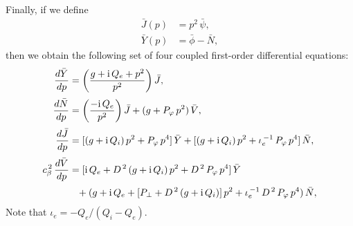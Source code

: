\documentclass[12pt,prb,aps]{revtex4-1}
\begin{document}
Finally, if we define 
\begin{align}
\bar{J}(p)&= p^2\,\bar{\psi},\\[0.5ex]
\bar{Y} (p)&= \bar{\phi}-\bar{N},\label{e43}
\end{align}
then we obtain the following set of four coupled first-order differential equations:
\begin{align}\label{e1}
\frac{d\bar{Y}}{dp} &= \left(\frac{g+{\rm i}\,Q_e+p^2}{p^2}\right)\bar{J},\\[0.5ex]
\frac{d\bar{N}}{dp} &= \left(\frac{-{\rm i}\,Q_e}{p^2}\right)\bar{J} + (g + P_\varphi\,p^2)\,\bar{V},\\[0.5ex]
\frac{d\bar{J}}{dp} &= [(g+{\rm i}\,Q_i)\,p^2 + P_\varphi\,p^4]\,\bar{Y}
+ [(g+{\rm i}\,Q_i)\,p^2 + \iota_e^{\,-1}\,P_\varphi\,p^4]\,\bar{N},\\[0.5ex]
c_\beta^{\,2}\,\frac{d\bar{V}}{dp} &= [{\rm i}\,Q_e+ D^{\,2}\,(g+{\rm i}\,Q_i)\,p^2 + D^{\,2}\,P_\varphi\,p^4]\,\bar{Y}
\nonumber\\[0.5ex]&\phantom{=} +(g+{\rm i}\,Q_e + [P_\perp+ D^{\,2}\,(g + {\rm i}\,Q_i)]\,p^2 + \iota_e^{\,-1}\,D^{\,2}\,P_\varphi\,p^4)\,\bar{N},\label{e4}
\end{align}
Note that $\iota_e= -Q_e/(Q_i-Q_e)$. 
\end{document}
